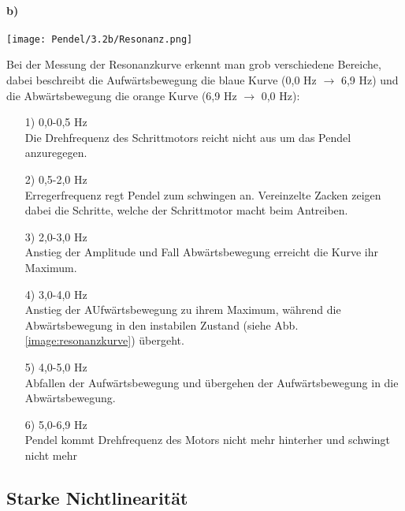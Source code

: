 \paragraph{b)}
\begin{center}
    \texttt{[image: Pendel/3.2b/Resonanz.png]}
    \label{image:resonanz}
\end{center}
Bei der Messung der Resonanzkurve erkennt man grob verschiedene Bereiche, dabei beschreibt die Aufwärtsbewegung die blaue Kurve (0,0 Hz $\rightarrow$ 6,9 Hz) und die Abwärtsbewegung die orange Kurve (6,9 Hz $\rightarrow$ 0,0 Hz):
\begin{itemize}
    \item[1)]0,0-0,5 Hz\\Die Drehfrequenz des Schrittmotors reicht nicht aus um das Pendel anzuregegen.
    \item[2)]0,5-2,0 Hz\\Erregerfrequenz regt Pendel zum schwingen an. Vereinzelte Zacken zeigen dabei die Schritte, welche der Schrittmotor macht beim Antreiben.
    \item[3)]2,0-3,0 Hz\\Anstieg der Amplitude und Fall Abwärtsbewegung erreicht die Kurve ihr Maximum.
    \item[4)]3,0-4,0 Hz\\Anstieg der AUfwärtsbewegung zu ihrem Maximum, während die Abwärtsbewegung in den instabilen Zustand (siehe Abb. \ref{image:resonanzkurve}) übergeht.
    \item[5)]4,0-5,0 Hz\\Abfallen der Aufwärtsbewegung und übergehen der Aufwärtsbewegung in die Abwärtsbewegung.
    \item[6)]5,0-6,9 Hz\\Pendel kommt Drehfrequenz des Motors nicht mehr hinterher und schwingt nicht mehr 
\end{itemize}
\subsection{Starke Nichtlinearität}
\label{sub:AuswertungstrongLin}
